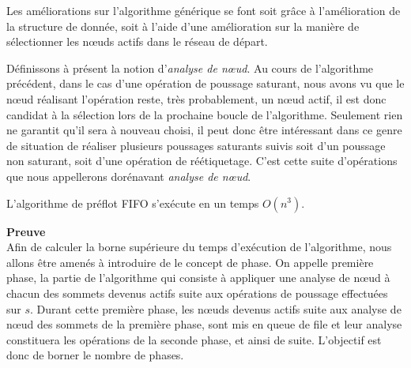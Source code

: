 Les améliorations sur l'algorithme générique se font soit grâce à l'amélioration de la structure de
donnée, soit à l'aide d'une amélioration sur la manière de sélectionner les n\oe uds actifs dans le
réseau de départ.

Définissons à présent la notion d'\emph{analyse de n\oe ud}. Au cours de l'algorithme précédent, dans
le cas d'une opération de poussage saturant, nous avons vu que le n\oe ud réalisant l'opération reste,
très probablement, un n\oe ud actif, il est donc candidat à la sélection lors de la prochaine boucle
de l'algorithme. Seulement rien ne garantit qu'il sera à nouveau choisi, il peut donc être
intéressant dans ce genre de situation de réaliser plusieurs poussages saturants suivis soit d'un
poussage non saturant, soit d'une opération de réétiquetage. C'est cette suite d'opérations que
nous appellerons dorénavant \emph{analyse de n\oe ud}.

\begin{thrm}
	L'algorithme de préflot FIFO s'exécute en un temps $O(n^3)$.
\end{thrm}

\textbf{Preuve} \\
Afin de calculer la borne supérieure du temps d'exécution de l'algorithme, nous allons être	amenés à
introduire de le concept de phase. On appelle première phase, la partie de l'algorithme qui consiste
à appliquer une analyse de n\oe ud à chacun des sommets devenus actifs suite aux opérations de
poussage effectuées sur $s$. Durant cette première phase, les n\oe uds devenus actifs suite aux
analyse de n\oe ud des sommets de la première phase, sont mis en queue de file et leur analyse
constituera les opérations de la seconde phase, et ainsi de suite. L'objectif est donc de borner le
nombre de phases.

